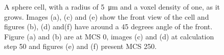 \begin{figure}[H]
\begin{center}
{	}
	\end{center}
	\caption[Growth of a sphere cell with a radius of 5]{\label{img:GrowthSphereCellRadius5}A sphere cell, with a radius of \SI{5}{\micro\metre} and a voxel density of one, as it grows. Images (a), (c) and (e) show the front view of the cell and figures (b), (d) and(f) have around a 45 degrees angle of the front. Figure (a) and (b) are at \ac{MCS} 0, images (c) and (d) at calculation step 50 and figures (e) and (f) present \ac{MCS} 250.}
\end{figure}

